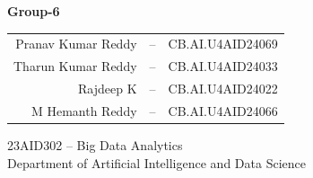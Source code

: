 \documentclass[aspectratio=169]{beamer}
\begin{document}
\begin{frame}[plain]
  \vfill
  \begin{center}
    \vskip 14pt
    
    {\large \bfseries Group-6}\\[6pt]
    \small
    \begin{tabular}{r c l}
      Pranav Kumar Reddy & -- & CB.AI.U4AID24069 \\
      Tharun Kumar Reddy & -- & CB.AI.U4AID24033 \\
      Rajdeep K          & -- & CB.AI.U4AID24022 \\
      M Hemanth Reddy    & -- & CB.AI.U4AID24066 \\
    \end{tabular}
    \vskip 10pt
    
    {\small 23AID302 -- Big Data Analytics}\\[2pt]
    {\small Department of Artificial Intelligence and Data Science}
  \end{center}
  \vfill
\end{frame}
\end{document}
